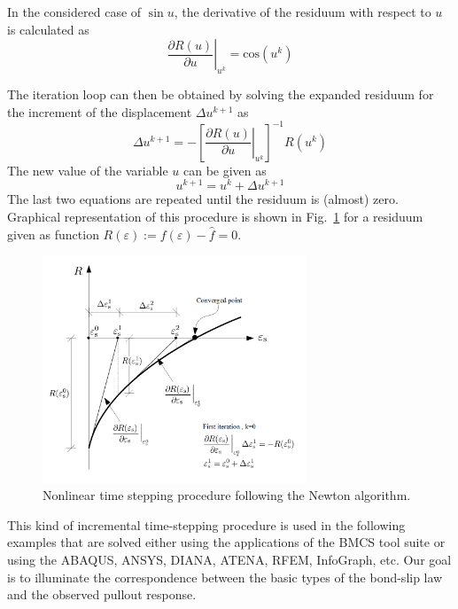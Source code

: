 \documentclass[main.tex]{subfiles}
\begin{document}
In the considered case of $\sin{u}$, the derivative of the residuum with respect to $u$ is calculated as
\begin{equation}
\left.\frac{ \partial R(u) }{ \partial u } \right|_{u^k} = \mathrm{cos}(u^k)
\end{equation}

The iteration loop can then be obtained by solving the expanded residuum for the  increment of the displacement  $\Delta u^{k+1}$ as
\begin{equation}
\Delta u^{k+1} = - \left[ \left.\frac{ \partial R(u) }{ \partial u }\right|_{u^k} \right]^{-1} R(u^k)
\end{equation}
The new value of the  variable $u$ can be given as
\begin{equation}
u^{k+1} = u^k + \Delta u^{k+1} 
\end{equation}
The last two equations are repeated until the residuum is (almost) zero.
Graphical representation of this procedure is shown in Fig.~\ref{FIGNewtonAlgorithm} for a residuum given as function
$R(\varepsilon) := f(\varepsilon) - \hat{f} = 0$.
\begin{figure}[ht]
	\centering
  \includegraphics[width=0.7\textwidth]{fig/Lecture03/iterative_scheme.png}
	\caption{Nonlinear time stepping procedure following the Newton algorithm.}
	\label{FIGNewtonAlgorithm}
\end{figure}

This kind of incremental time-stepping procedure is used in the following examples that are solved either using the applications of the BMCS tool suite 
or using the ABAQUS, ANSYS, DIANA, ATENA, RFEM, InfoGraph, etc. Our goal is to illuminate the correspondence between the basic types of the bond-slip law and the observed pullout response. 
\end{document}
